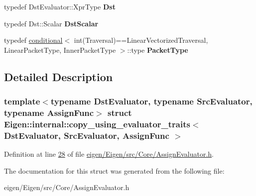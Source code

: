 \begin{DoxyCompactItemize}
typedef Dst\+Evaluator\+::\+Xpr\+Type {\bfseries Dst}
\item 
\mbox{\label{struct_eigen_1_1internal_1_1copy__using__evaluator__traits_af449f8796c0ea6e750096672bad13525}} 
typedef Dst\+::\+Scalar {\bfseries Dst\+Scalar}
\item 
\mbox{\label{struct_eigen_1_1internal_1_1copy__using__evaluator__traits_acfc32ecb7201ba969f37e61c65e9b934}} 
typedef \hyperlink{struct_eigen_1_1internal_1_1conditional}{conditional}$<$ int(Traversal)==Linear\+Vectorized\+Traversal, Linear\+Packet\+Type, Inner\+Packet\+Type $>$\+::type {\bfseries Packet\+Type}
\end{DoxyCompactItemize}


\subsection{Detailed Description}
\subsubsection*{template$<$typename Dst\+Evaluator, typename Src\+Evaluator, typename Assign\+Func$>$\newline
struct Eigen\+::internal\+::copy\+\_\+using\+\_\+evaluator\+\_\+traits$<$ Dst\+Evaluator, Src\+Evaluator, Assign\+Func $>$}



Definition at line \hyperlink{eigen_2_eigen_2src_2_core_2_assign_evaluator_8h_source_l00028}{28} of file \hyperlink{eigen_2_eigen_2src_2_core_2_assign_evaluator_8h_source}{eigen/\+Eigen/src/\+Core/\+Assign\+Evaluator.\+h}.



The documentation for this struct was generated from the following file\+:\begin{DoxyCompactItemize}
\item 
eigen/\+Eigen/src/\+Core/\+Assign\+Evaluator.\+h\end{DoxyCompactItemize}
